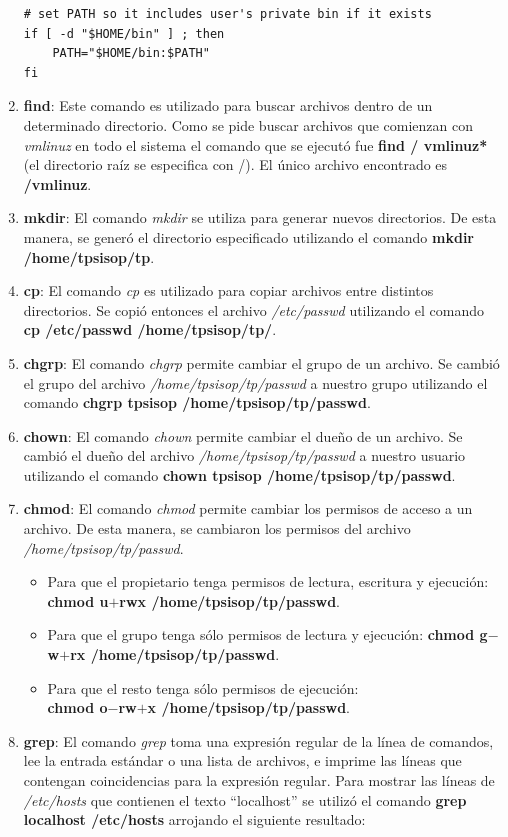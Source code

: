 \documentclass[a4paper,11pt] {article}
\begin{document}
\begin{enumerate}
\begin{verbatim}
# set PATH so it includes user's private bin if it exists
if [ -d "$HOME/bin" ] ; then
    PATH="$HOME/bin:$PATH"
fi
	\end{verbatim}
	\item \textbf{find}: Este comando es utilizado para buscar archivos dentro de un determinado directorio. Como se pide buscar archivos que comienzan con \textit{vmlinuz} en todo el sistema el comando que se ejecut\'o fue \textbf{find / vmlinuz*} (el directorio ra\'iz se especifica con /). El \'unico archivo encontrado es \textbf{/vmlinuz}.
	\item \textbf{mkdir}: El comando \textit{mkdir} se utiliza para generar nuevos directorios. De esta manera, se gener\'o el directorio especificado utilizando el comando \textbf{mkdir /home/tpsisop/tp}.
	\item \textbf{cp}: El comando \textit{cp} es utilizado para copiar archivos entre distintos directorios. Se copi\'o entonces el archivo \textit{/etc/passwd} utilizando el comando \textbf{cp /etc/passwd /home/tpsisop/tp/}.
	\item \textbf{chgrp}: El comando \textit{chgrp} permite cambiar el grupo de un archivo. Se cambi\'o el grupo del archivo \textit{/home/tpsisop/tp/passwd} a nuestro grupo utilizando el comando \textbf{chgrp tpsisop /home/tpsisop/tp/passwd}.
	\item \textbf{chown}: El comando \textit{chown} permite cambiar el dueño de un archivo. Se cambi\'o el dueño del archivo \textit{/home/tpsisop/tp/passwd} a nuestro usuario utilizando el comando \textbf{chown tpsisop /home/tpsisop/tp/passwd}.
	\item \textbf{chmod}: El comando \textit{chmod} permite cambiar los permisos de acceso a un archivo. De esta manera, se cambiaron los permisos del archivo \textit{/home/tpsisop/tp/passwd}.
		\begin{itemize}
			\item Para que el propietario tenga permisos de lectura, escritura y ejecuci\'on: \textbf{chmod u$+$rwx /home/tpsisop/tp/passwd}.
			\item Para que el grupo tenga s\'olo permisos de lectura y ejecuci\'on: \textbf{chmod g$-$w$+$rx /home/tpsisop/tp/passwd}.
			\item Para que el resto tenga s\'olo permisos de ejecuci\'on: \\ \textbf{chmod o$-$rw$+$x /home/tpsisop/tp/passwd}.
		\end{itemize}
	\item \textbf{grep}: El comando \textit{grep} toma una expresión regular de la línea de comandos, lee la entrada est\'andar o una lista de archivos, e imprime las l\'ineas que contengan coincidencias para la expresi\'on regular. Para mostrar las l\'ineas de \textit{/etc/hosts} que contienen el texto ``localhost'' se utiliz\'o el comando \textbf{grep localhost /etc/hosts} arrojando el siguiente resultado:

\end{enumerate}
\end{document}
